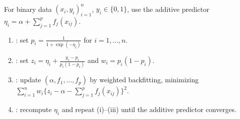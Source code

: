 \begin{method} \label{meth:sl-local-scoring-additive-logistic} \\
For binary data $(x_i,y_i)_{i=1}^n$, $y_i\in\{0,1\}$, use the additive predictor $\eta_i=\alpha+\sum\limits_{j=1}^p f_j(x_{ij})$.
\begin{enumerate}[label=(\roman*)]
\setlength{\itemsep}{0pt}
\item {}: set $p_i=\frac{1}{1+\exp(-\eta_i)}$ for $i=1,\ldots,n$.
\item {}: set $z_i=\eta_i+\frac{y_i-p_i}{p_i(1-p_i)}$ and $w_i=p_i(1-p_i)$.
\item {}: update $(\alpha,f_1,\ldots,f_p)$ by weighted backfitting, minimizing $\sum\limits_{i=1}^n w_i\{z_i-\alpha-\sum\limits_{j=1}^p f_j(x_{ij})\}^2$.
\item {}: recompute $\eta_i$ and repeat (i)--(iii) until the additive predictor converges.
\end{enumerate}
\end{method}
